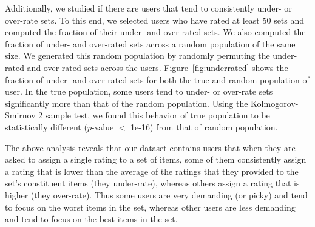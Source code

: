 Additionally, we studied if there are users that tend to consistently under- or
over-rate sets. To this end, we selected users who have rated at
least 50 sets and computed the fraction of their under- and over-rated sets.
We also computed the fraction of under- and over-rated sets across a random
population of the same size. We generated this random population by randomly
permuting the under-rated and over-rated sets across the users.
Figure~\ref{fig:underrated} shows the fraction of under- and over-rated sets
for both the true and random population of user. 
In the true population, some users tend to under- or over-rate sets
significantly more than that of the random population. Using the Kolmogorov-Smirnov 2 sample test, 
we found this behavior of true population to be statistically different ($p$-value $<$ 1e-16) from that of 
random population. 

The above analysis reveals that our dataset contains users that when they are
asked to assign a single rating to a set of
items, some of them consistently assign a rating that is lower than the
average of the ratings that they provided
to the set's constituent items (they under-rate), whereas others assign a rating
that is higher (they over-rate). Thus some
users are very demanding (or picky) and tend to focus on the worst items in the set,
whereas other users are less demanding and
tend to focus on the best items in the set. 


